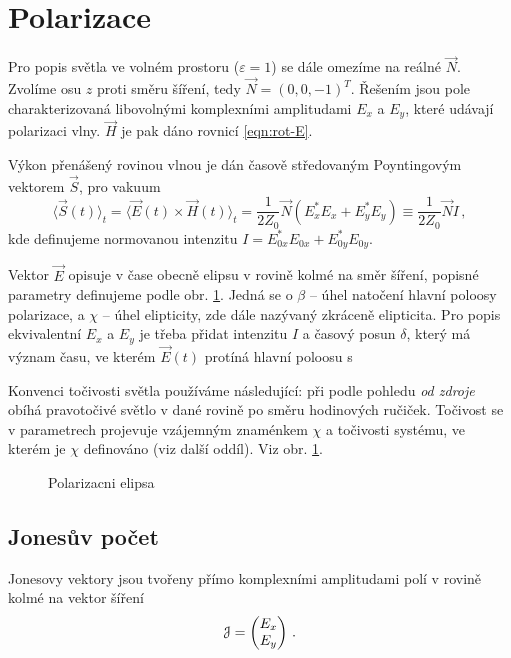 \section{Polarizace}
\label{chap:polarizace}

Pro popis světla ve volném prostoru ($\varepsilon=1$) se dále omezíme na reálné $\vec{N}$.
Zvolíme osu $z$ proti směru šíření, tedy $\vec{N}=(0,0,-1)^T$.
Řešením jsou pole charakterizovaná libovolnými komplexními amplitudami $E_x$ a $E_y$, které udávají polarizaci vlny.
$\vec{H}$ je pak dáno rovnicí \eqref{eqn:rot-E}.

Výkon přenášený rovinou vlnou je dán časově středovaným Poyntingovým vektorem $\vec{S}$, pro vakuum\cite{bornPrinciplesOpticsElectromagnetic1999}
\begin{equation} \label{eqn:Poynting}
    \langle \vec{S}(t)\rangle_t=\langle\vec{E}(t)\times\vec{H}(t)\rangle_t=\frac{1}{2 Z_0}\vec{N} \left( E_x^*E_x+E_y^*E_y \right)
    \equiv \frac{1}{2 Z_0}\vec{N} I\,,
\end{equation}
kde definujeme normovanou intenzitu $I=E_{0x}^*E_{0x}+E_{0y}^*E_{0y}$.

Vektor $\vec{E}$ opisuje v čase obecně elipsu v rovině kolmé na směr šíření, popisné parametry definujeme podle obr. \ref{fig:polarizacni-elipsa}.
Jedná se o $\beta$ -- úhel natočení hlavní poloosy polarizace, a $\chi$ -- úhel elipticity, zde dále nazývaný zkráceně elipticita.
Pro popis ekvivalentní $E_x$ a $E_y$ je třeba přidat intenzitu $I$ a časový posun $\delta$, který má význam času, ve kterém $\vec{E}(t)$ protíná hlavní poloosu s

Konvenci točivosti světla používáme následující: při podle pohledu \emph{od zdroje} obíhá pravotočivé světlo v dané rovině po směru hodinových ručiček.
Točivost se v parametrech projevuje vzájemným znaménkem $\chi$ a točivosti systému, ve kterém je $\chi$ definováno (viz další oddíl).
Viz obr. \ref{fig:polarizacni-elipsa}.

\begin{figure}[htbp]
    \centering
    \caption{Polarizacni elipsa}
    \label{fig:polarizacni-elipsa}
\end{figure}

\subsection{Jonesův počet}
\label{chap:Jones}

Jonesovy vektory\cite{azzamEllipsometryPolarizedLight1977} jsou tvořeny přímo komplexními amplitudami polí v rovině kolmé na vektor šíření
\begin{equation}
    \mathcal{J}=\begin{pmatrix} E_{x} \\ E_{y} \end{pmatrix} \,.
\end{equation}

